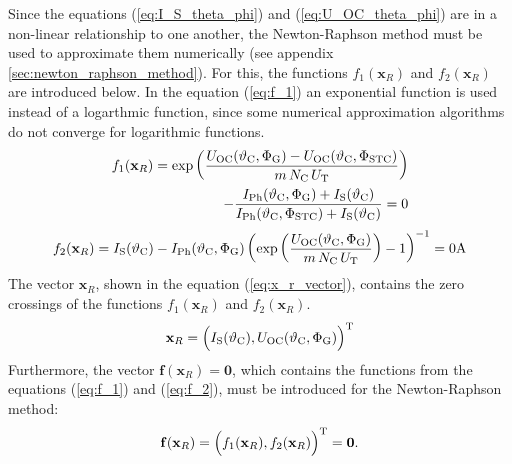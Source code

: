 Since the equations (\ref{eq:I_S_theta_phi}) and (\ref{eq:U_OC_theta_phi}) are in a non-linear relationship to one another, the Newton-Raphson method must be used to approximate them numerically (see appendix \ref{sec:newton_raphson_method}). For this, the functions $f_1(\mathrm{\mathbf{x}}_R)$ and $f_2(\mathrm{\mathbf{x}}_R)$ are introduced below. In the equation (\ref{eq:f_1}) an exponential function is used instead of a logarthmic function, since some numerical approximation algorithms do not converge for logarithmic functions.
	\begin{equation} \label{eq:f_1}
	\centering
		\begin{split}
		f_1(\mathrm{\mathbf{x}}_R) = \exp \left( \frac{U_\mathrm{OC}(\vartheta_{\mathrm{C}}, \Phi_{\mathrm{G}}) - U_\mathrm{OC}(\vartheta_{\mathrm{C}},\Phi_\mathrm{STC})}{m \, N_\mathrm{C} \, U_\mathrm{T}} \right) \\ - \frac{I_{\mathrm{Ph}}(\vartheta_{\mathrm{C}}, \Phi_{\mathrm{G}}) + I_{\mathrm{S}}(\vartheta_{\mathrm{C}})}{I_\mathrm{Ph}(\vartheta_{\mathrm{C}},\Phi_\mathrm{STC}) + I_{\mathrm{S}}(\vartheta_{\mathrm{C}})} = 0
		\end{split}
	\end{equation}
	\begin{equation} \label{eq:f_2}
	\centering
		f_2(\mathrm{\mathbf{x}}_R) = I_\mathrm{S}(\vartheta_{\mathrm{C}}) - I_\mathrm{Ph}(\vartheta_{\mathrm{C}}, \Phi_{\mathrm{G}}) \left(\exp \left(\frac{U_\mathrm{OC}(\vartheta_{\mathrm{C}}, \Phi_{\mathrm{G}})}{m \, N_\mathrm{C} \, U_\mathrm{T}} \right) - 1 \right)^{-1} = 0\mathrm{A}
	\end{equation}
The vector $\mathrm{\mathbf{x}}_R$, shown in the equation (\ref{eq:x_r_vector}), contains the zero crossings of the functions $f_1(\mathrm{\mathbf{x}}_R)$ and $f_2(\mathrm{\mathbf{x}}_R)$. 
	\begin{equation} \label{eq:x_r_vector}
	\centering
		\mathrm{\mathbf{x}}_R = \Big( I_\mathrm{S}(\vartheta_{\mathrm{C}}), U_\mathrm{OC}(\vartheta_{\mathrm{C}}, \Phi_{\mathrm{G}}) \Big)^{\mathrm T}
	\end{equation}
Furthermore, the vector $\mathrm{\mathbf{f}}(\mathrm{\mathbf{x}}_R) = \mathbf{0}$, which contains the functions from the equations (\ref{eq:f_1}) and (\ref{eq:f_2}), must be introduced for the Newton-Raphson method:
	\begin{equation} \label{eq:f_vector}
	\centering
		\mathrm{\mathbf{f}}(\mathrm{\mathbf{x}}_R) = 
  			\Big( f_{1}(\mathrm{\mathbf{x}}_R), f_{2}(\mathrm{\mathbf{x}}_R) \Big)^{\mathrm T} = \mathrm{\mathbf{0}} \text{.}
	\end{equation}
